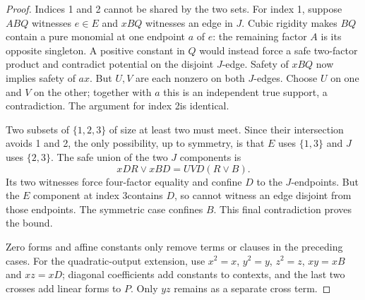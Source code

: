 \documentclass[11pt]{article}
\theoremstyle{definition}
\theoremstyle{remark}
\begin{document}
\begin{proof}
Indices 1 and 2 cannot be shared by the two sets. For index 1, suppose $ABQ$ witnesses $e\in E$ and $xBQ$ witnesses an edge in $J$. Cubic rigidity makes $BQ$ contain a pure monomial at one endpoint $a$ of $e$: the remaining factor $A$ is its opposite singleton. A positive constant in $Q$ would instead force a safe two-factor product and contradict potential on the disjoint $J$-edge. Safety of $xBQ$ now implies safety of $ax$. But $U,V$ are each nonzero on both $J$-edges. Choose $U$ on one and $V$ on the other; together with $a$ this is an independent true support, a contradiction. The argument for index 2is identical.

Two subsets of $\{1,2,3\}$ of size at least two must meet. Since their intersection avoids 1 and 2, the only possibility, up to symmetry, is that $E$ uses $\{1,3\}$ and $J$ uses $\{2,3\}$. The safe union of the two $J$ components is
\[
 xDR\vee xBD=UVD(R\vee B).
\]
Its two witnesses force four-factor equality and confine $D$ to the $J$-endpoints. But the $E$ component at index 3contains $D$, so cannot witness an edge disjoint from those endpoints. The symmetric case confines $B$. This final contradiction proves the bound.

Zero forms and affine constants only remove terms or clauses in the preceding cases. For the quadratic-output extension, use $x^2=x$, $y^2=y$, $z^2=z$, $xy=xB$ and $xz=xD$; diagonal coefficients add constants to contexts, and the last two crosses add linear forms to $P$. Only $yz$ remains as a separate cross term.
\end{proof}
\end{document}
